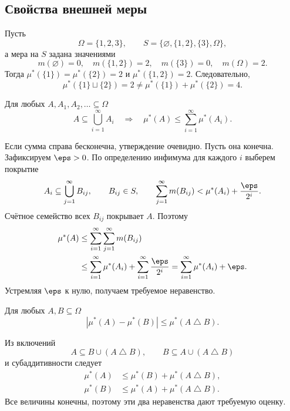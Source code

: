 \newpage
\subsection{Свойства внешней меры}

\begin{example}
    Пусть
    \[
        \Omega=\{1,2,3\},\qquad
        S=\{\varnothing,\{1,2\},\{3\},\Omega\},
    \]
    а мера на $S$ задана значениями
    \[
        m(\varnothing)=0,\quad m(\{1,2\})=2,\quad
        m(\{3\})=0,\quad m(\Omega)=2.
    \]
    Тогда $\mu^*(\{1\})=\mu^*(\{2\})=2$ и $\mu^*(\{1,2\})=2$.
    Следовательно,
    \[
        \mu^*(\{1\}\sqcup\{2\})=2
        \ne\mu^*(\{1\})+\mu^*(\{2\})=4.
    \]
\end{example}

\begin{theorem}
    Для любых $A,A_1,A_2,\ldots\subseteq\Omega$
    \[
        A\subseteq\bigcup_{i=1}^{\infty}A_i
        \quad\Longrightarrow\quad
        \mu^*(A)\leq\sum_{i=1}^{\infty}\mu^*(A_i).
    \]
\end{theorem}

\begin{Proof}
    Если сумма справа бесконечна, утверждение очевидно.
    Пусть она конечна. Зафиксируем $\eps>0$. По определению инфимума
    для каждого $i$ выберем покрытие
    \[
        A_i\subseteq\bigcup_{j=1}^{\infty}B_{ij},\qquad B_{ij}\in S,
        \qquad
        \sum_{j=1}^{\infty}m(B_{ij})<\mu^*(A_i)+\frac{\eps}{2^i}.
    \]
    Счётное семейство всех $B_{ij}$ покрывает $A$. Поэтому
    \[
        \begin{aligned}
            \mu^*(A)
            &\leq\sum_{i=1}^{\infty}\sum_{j=1}^{\infty}m(B_{ij})\\
            &\leq\sum_{i=1}^{\infty}\mu^*(A_i)
                 +\sum_{i=1}^{\infty}\frac{\eps}{2^i}
             =\sum_{i=1}^{\infty}\mu^*(A_i)+\eps.
        \end{aligned}
    \]
    Устремляя $\eps$ к нулю, получаем требуемое неравенство.
\end{Proof}

\newpage
\begin{theorem}
    Для любых $A,B\subseteq\Omega$
    \[
        |\mu^*(A)-\mu^*(B)|\leq\mu^*(A\mathbin{\triangle}B).
    \]
\end{theorem}

\begin{Proof}
    Из включений
    \[
        A\subseteq B\cup(A\mathbin{\triangle}B),\qquad
        B\subseteq A\cup(A\mathbin{\triangle}B)
    \]
    и субаддитивности следует
    \[
        \begin{aligned}
            \mu^*(A)&\leq\mu^*(B)+\mu^*(A\mathbin{\triangle}B),\\
            \mu^*(B)&\leq\mu^*(A)+\mu^*(A\mathbin{\triangle}B).
        \end{aligned}
    \]
    Все величины конечны, поэтому эти два неравенства дают требуемую оценку.
\end{Proof}

